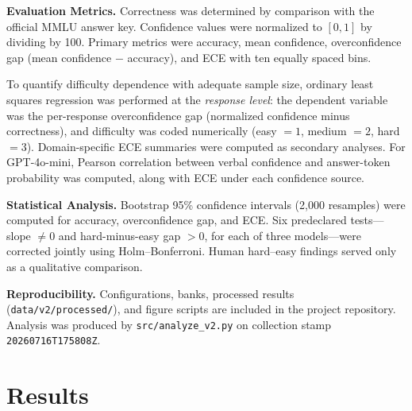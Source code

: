 \documentclass[twoside,twocolumn,10pt]{article}
\begin{document}
\begin{table}[ht]
\centering
\caption{Response parse rates by model.}
\label{tab:parse}
\end{table}

\textbf{Evaluation Metrics.}
Correctness was determined by comparison with the official MMLU answer key. Confidence values were normalized to $[0,1]$ by dividing by 100. Primary metrics were accuracy, mean confidence, overconfidence gap (mean confidence $-$ accuracy), and ECE with ten equally spaced bins.

To quantify difficulty dependence with adequate sample size, ordinary least squares regression was performed at the \emph{response level}: the dependent variable was the per-response overconfidence gap (normalized confidence minus correctness), and difficulty was coded numerically (easy $= 1$, medium $= 2$, hard $= 3$). Domain-specific ECE summaries were computed as secondary analyses. For GPT-4o-mini, Pearson correlation between verbal confidence and answer-token probability was computed, along with ECE under each confidence source.

\textbf{Statistical Analysis.}
Bootstrap 95\% confidence intervals (2{,}000 resamples) were computed for accuracy, overconfidence gap, and ECE. Six predeclared tests---slope $\neq 0$ and hard-minus-easy gap $> 0$, for each of three models---were corrected jointly using Holm--Bonferroni. Human hard--easy findings served only as a qualitative comparison.

\textbf{Reproducibility.}
Configurations, banks, processed results (\texttt{data/v2/processed/}), and figure scripts are included in the project repository. Analysis was produced by \texttt{src/analyze\_v2.py} on collection stamp \texttt{20260716T175808Z}.

\section{Results}

\fontsize{12}{14}\selectfont
\end{document}
